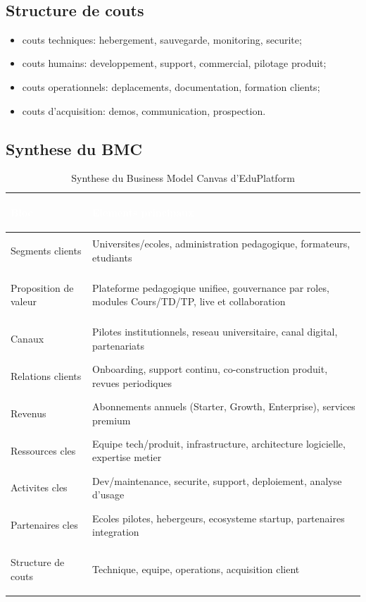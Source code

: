 ﻿﻿\documentclass[12pt,a4paper,oneside]{report}
\begin{document}
\subsection{Structure de couts}

\begin{itemize}
  \item couts techniques: hebergement, sauvegarde, monitoring, securite;
  \item couts humains: developpement, support, commercial, pilotage produit;
  \item couts operationnels: deplacements, documentation, formation clients;
  \item couts d'acquisition: demos, communication, prospection.
\end{itemize}

\subsection{Synthese du BMC}

\renewcommand{\arraystretch}{1.45}
\begin{longtable}{|>{\bfseries\raggedright\arraybackslash}p{3.2cm}|p{10.2cm}|}
\caption{Synthese du Business Model Canvas d'EduPlatform}
\label{tab:bmc_edconnect} \\
\hline
\rowcolor{ustoblue}
\textcolor{white}{Bloc} & \textcolor{white}{Elements principaux} \\
\hline
Segments clients & Universites/ecoles, administration pedagogique, formateurs, etudiants \\
\hline
Proposition de valeur & Plateforme pedagogique unifiee, gouvernance par roles, modules Cours/TD/TP, live et collaboration \\
\hline
Canaux & Pilotes institutionnels, reseau universitaire, canal digital, partenariats \\
\hline
Relations clients & Onboarding, support continu, co-construction produit, revues periodiques \\
\hline
Revenus & Abonnements annuels (Starter, Growth, Enterprise), services premium \\
\hline
Ressources cles & Equipe tech/produit, infrastructure, architecture logicielle, expertise metier \\
\hline
Activites cles & Dev/maintenance, securite, support, deploiement, analyse d'usage \\
\hline
Partenaires cles & Ecoles pilotes, hebergeurs, ecosysteme startup, partenaires integration \\
\hline
Structure de couts & Technique, equipe, operations, acquisition client \\
\hline
\end{longtable}
\end{document}
